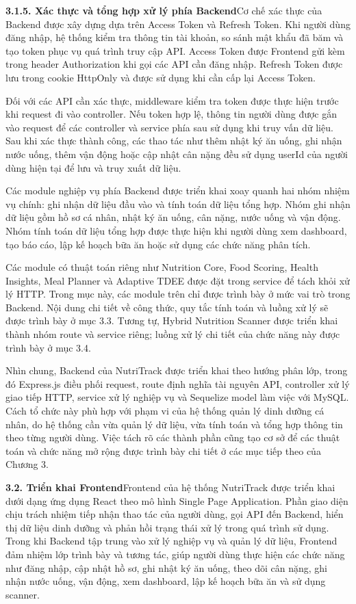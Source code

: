 \textbf{3.1.5. Xác thực và tổng hợp xử lý phía Backend}Cơ chế xác thực của Backend được xây dựng dựa trên Access Token và Refresh Token. Khi người dùng đăng nhập, hệ thống kiểm tra thông tin tài khoản, so sánh mật khẩu đã băm và tạo token phục vụ quá trình truy cập API. Access Token được Frontend gửi kèm trong header Authorization khi gọi các API cần đăng nhập. Refresh Token được lưu trong cookie HttpOnly và được sử dụng khi cần cấp lại Access Token.

Đối với các API cần xác thực, middleware kiểm tra token được thực hiện trước khi request đi vào controller. Nếu token hợp lệ, thông tin người dùng được gắn vào request để các controller và service phía sau sử dụng khi truy vấn dữ liệu. Sau khi xác thực thành công, các thao tác như thêm nhật ký ăn uống, ghi nhận nước uống, thêm vận động hoặc cập nhật cân nặng đều sử dụng userId của người dùng hiện tại để lưu và truy xuất dữ liệu.

Các module nghiệp vụ phía Backend được triển khai xoay quanh hai nhóm nhiệm vụ chính: ghi nhận dữ liệu đầu vào và tính toán dữ liệu tổng hợp. Nhóm ghi nhận dữ liệu gồm hồ sơ cá nhân, nhật ký ăn uống, cân nặng, nước uống và vận động. Nhóm tính toán dữ liệu tổng hợp được thực hiện khi người dùng xem dashboard, tạo báo cáo, lập kế hoạch bữa ăn hoặc sử dụng các chức năng phân tích.

Các module có thuật toán riêng như Nutrition Core, Food Scoring, Health Insights, Meal Planner và Adaptive TDEE được đặt trong service để tách khỏi xử lý HTTP. Trong mục này, các module trên chỉ được trình bày ở mức vai trò trong Backend. Nội dung chi tiết về công thức, quy tắc tính toán và luồng xử lý sẽ được trình bày ở mục 3.3. Tương tự, Hybrid Nutrition Scanner được triển khai thành nhóm route và service riêng; luồng xử lý chi tiết của chức năng này được trình bày ở mục 3.4.

Nhìn chung, Backend của NutriTrack được triển khai theo hướng phân lớp, trong đó Express.js điều phối request, route định nghĩa tài nguyên API, controller xử lý giao tiếp HTTP, service xử lý nghiệp vụ và Sequelize model làm việc với MySQL. Cách tổ chức này phù hợp với phạm vi của hệ thống quản lý dinh dưỡng cá nhân, do hệ thống cần vừa quản lý dữ liệu, vừa tính toán và tổng hợp thông tin theo từng người dùng. Việc tách rõ các thành phần cũng tạo cơ sở để các thuật toán và chức năng mở rộng được trình bày chi tiết ở các mục tiếp theo của Chương 3.

\textbf{3.2. Triển khai Frontend}Frontend của hệ thống NutriTrack được triển khai dưới dạng ứng dụng React theo mô hình Single Page Application. Phần giao diện chịu trách nhiệm tiếp nhận thao tác của người dùng, gọi API đến Backend, hiển thị dữ liệu dinh dưỡng và phản hồi trạng thái xử lý trong quá trình sử dụng. Trong khi Backend tập trung vào xử lý nghiệp vụ và quản lý dữ liệu, Frontend đảm nhiệm lớp trình bày và tương tác, giúp người dùng thực hiện các chức năng như đăng nhập, cập nhật hồ sơ, ghi nhật ký ăn uống, theo dõi cân nặng, ghi nhận nước uống, vận động, xem dashboard, lập kế hoạch bữa ăn và sử dụng scanner.

